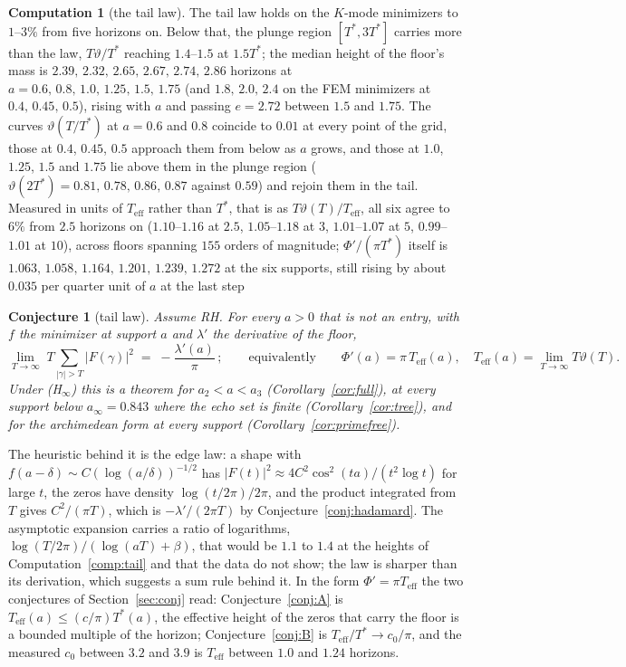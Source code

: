 \documentclass[11pt]{article}
\newtheorem{conjecture}[theorem]{Conjecture}
\theoremstyle{definition}
\newtheorem{computation}[theorem]{Computation}
\theoremstyle{remark}
\newcommand{\Tst}{T^{*}}
\begin{document}
\begin{computation}[the tail law]
The tail law holds on the $K$-mode minimizers to $1$--$3\%$ from five horizons on. Below that, the plunge region $[\Tst,3\Tst]$ carries more than the law, $T\vartheta/\Tst$ reaching $1.4$--$1.5$ at $1.5\Tst$; the median height of the floor's mass is $2.39,\,2.32,\,2.65,\,2.67,\,2.74,\,2.86$ horizons at $a=0.6,\,0.8,\,1.0,\,1.25,\,1.5,\,1.75$ (and $1.8,\,2.0,\,2.4$ on the FEM minimizers at $0.4,\,0.45,\,0.5$), rising with $a$ and passing $e=2.72$ between $1.5$ and $1.75$. The curves $\vartheta(T/\Tst)$ at $a=0.6$ and $0.8$ coincide to $0.01$ at every point of the grid, those at $0.4$, $0.45$, $0.5$ approach them from below as $a$ grows, and those at $1.0$, $1.25$, $1.5$ and $1.75$ lie above them in the plunge region ($\vartheta(2\Tst)=0.81,\,0.78,\,0.86,\,0.87$ against $0.59$) and rejoin them in the tail. Measured in units of $T_{\mathrm{eff}}$ rather than $\Tst$, that is as $T\vartheta(T)/T_{\mathrm{eff}}$, all six agree to $6\%$ from $2.5$ horizons on ($1.10$--$1.16$ at $2.5$, $1.05$--$1.18$ at $3$, $1.01$--$1.07$ at $5$, $0.99$--$1.01$ at $10$), across floors spanning $155$ orders of magnitude; $\Phi'/(\pi\Tst)$ itself is $1.063,\,1.058,\,1.164,\,1.201,\,1.239,\,1.272$ at the six supports, still rising by about $0.035$ per quarter unit of $a$ at the last step
\end{computation}

\begin{conjecture}[tail law]\label{conj:tail}
Assume RH. For every $a>0$ that is not an entry, with $f$ the minimizer at support $a$ and $\lambda'$ the derivative of the floor,
\[
\lim_{T\to\infty}\;T\sum_{|\gamma|>T}|F(\gamma)|^2\;=\;-\frac{\lambda'(a)}{\pi}\,;\qquad\text{equivalently}\qquad \Phi'(a)=\pi\,T_{\mathrm{eff}}(a),\quad T_{\mathrm{eff}}(a)=\lim_{T\to\infty}T\vartheta(T).
\]
Under (H$_\infty$) this is a theorem for $a_2<a<a_3$ (Corollary~\ref{cor:full}), at every support below $a_\infty=0.843$ where the echo set is finite (Corollary~\ref{cor:tree}), and for the archimedean form at every support (Corollary~\ref{cor:primefree}).
\end{conjecture}

The heuristic behind it is the edge law: a shape with $f(a-\delta)\sim C(\log(a/\delta))^{-1/2}$ has $|F(t)|^2\approx4C^2\cos^2(ta)/(t^2\log t)$ for large $t$, the zeros have density $\log(t/2\pi)/2\pi$, and the product integrated from $T$ gives $C^2/(\pi T)$, which is $-\lambda'/(2\pi T)$ by Conjecture~\ref{conj:hadamard}. The asymptotic expansion carries a ratio of logarithms, $\log(T/2\pi)/(\log(aT)+\beta)$, that would be $1.1$ to $1.4$ at the heights of Computation~\ref{comp:tail} and that the data do not show; the law is sharper than its derivation, which suggests a sum rule behind it. In the form $\Phi'=\pi T_{\mathrm{eff}}$ the two conjectures of Section~\ref{sec:conj} read: Conjecture~\ref{conj:A} is $T_{\mathrm{eff}}(a)\le(c/\pi)\Tst(a)$, the effective height of the zeros that carry the floor is a bounded multiple of the horizon; Conjecture~\ref{conj:B} is $T_{\mathrm{eff}}/\Tst\to c_0/\pi$, and the measured $c_0$ between $3.2$ and $3.9$ is $T_{\mathrm{eff}}$ between $1.0$ and $1.24$ horizons.
\end{document}
